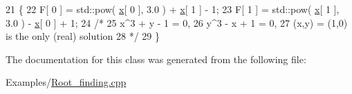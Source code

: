 \begin{DoxyCode}
21             \{
22                 F[ 0 ] = std::pow( \hyperlink{namespaceHeat__plot_aa88370c16b85b784ccbde3ed88bc1991}{x}[ 0 ], 3.0 ) + \hyperlink{namespaceHeat__plot_aa88370c16b85b784ccbde3ed88bc1991}{x}[ 1 ] - 1;
23                 F[ 1 ] = std::pow( \hyperlink{namespaceHeat__plot_aa88370c16b85b784ccbde3ed88bc1991}{x}[ 1 ], 3.0 ) - \hyperlink{namespaceHeat__plot_aa88370c16b85b784ccbde3ed88bc1991}{x}[ 0 ] + 1;
24                 \textcolor{comment}{/*}
25 \textcolor{comment}{                    x^3 + y - 1 = 0,}
26 \textcolor{comment}{                    y^3 - x + 1 = 0,}
27 \textcolor{comment}{                    (x,y) = (1,0) is the only (real) solution}
28 \textcolor{comment}{                */}
29             \}
\end{DoxyCode}


The documentation for this class was generated from the following file\+:\begin{DoxyCompactItemize}
\item 
Examples/\hyperlink{Root__finding_8cpp}{Root\+\_\+finding.\+cpp}\end{DoxyCompactItemize}
